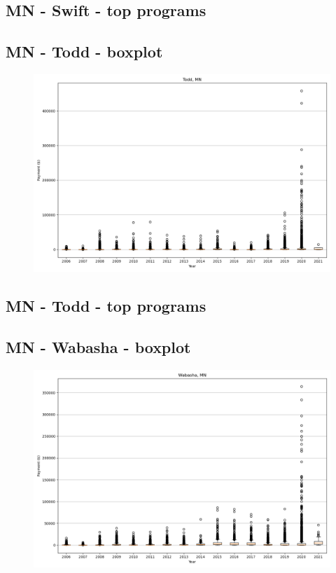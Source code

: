\subsection*{MN - Swift - top programs}

\newpage
\subsection*{MN - Todd - boxplot}
\begin{figure}[h]
\centering
\includegraphics[width=7in]{../output/boxplots/counties/Todd-MN_boxplot.png}
\end{figure}


\subsection*{MN - Todd - top programs}

\newpage
\subsection*{MN - Wabasha - boxplot}
\begin{figure}[h]
\centering
\includegraphics[width=7in]{../output/boxplots/counties/Wabasha-MN_boxplot.png}
\end{figure}


